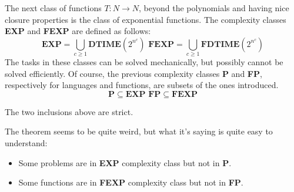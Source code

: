 The next class of functions $T: N \rightarrow N$, beyond the polynomials and having nice closure properties is the class of exponential functions. The complexity
classes \textbf{EXP} and \textbf{FEXP} are defined as follows:
$$ \textbf{EXP} = \bigcup_{c \geq 1} \textbf{DTIME}(2^{n^c}) \textbf{ FEXP} = \bigcup_{c \geq 1} \textbf{FDTIME}(2^{n^c})$$
The tasks in these classes can be solved mechanically, but possibly cannot be solved efficiently. Of course, the previous complexity classes \textbf{P} and 
\textbf{FP}, respectively for languages and functions, are subsets of the ones introduced.
$$ \textbf{P} \subseteq \textbf{EXP} \textbf{ FP} \subseteq \textbf{FEXP}$$
\begin{definition}[title = Theorem]
    The two inclusions above are strict.
\end{definition}
The theorem seems to be quite weird, but what it's saying is quite easy to understand:
\begin{itemize}
    \renewcommand{\labelitemi}{-}
    \item Some problems are in \textbf{EXP} complexity class but not in \textbf{P}.
    \item Some functions are in \textbf{FEXP} complexity class but not in \textbf{FP}.
\end{itemize} 
